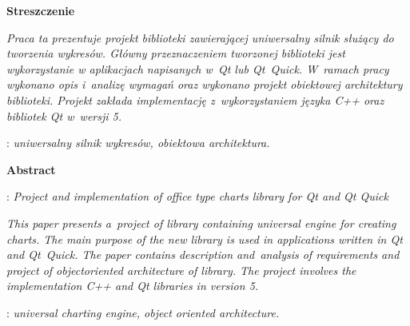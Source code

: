 \begin{titlepage}
    \newpage\thispagestyle{empty}
    \vspace*{2\baselineskip}
    \begin{center}
	{\large\bfseries Streszczenie}\par\bigskip
    \end{center}

    {\itshape
    Praca ta prezentuje projekt biblioteki zawierającej uniwersalny silnik służący do tworzenia wykresów. Główny przeznaczeniem tworzonej biblioteki jest wykorzystanie w aplikacjach napisanych w~Qt lub Qt~Quick.
	W~ramach pracy wykonano opis i~analizę wymagań oraz wykonano projekt obiektowej architektury biblioteki. Projekt zakłada implementację z~wykorzystaniem języka C++ oraz bibliotek Qt w~wersji 5.
	}
    \vspace*{1\baselineskip}

    : {\itshape uniwersalny silnik wykresów, obiektowa architektura.}
    \par
    \vspace{4\baselineskip}
    \begin{center}
	{\large\bfseries Abstract}\par\bigskip
    \end{center}
    : {\itshape Project and implementation of office type charts library for Qt and Qt Quick}\par
    \vspace*{1\baselineskip}
    {\itshape
    This paper presents a~project of library containing universal engine for creating charts. The main purpose of the new library is used in applications written in Qt and Qt~Quick.
The paper contains description and~analysis of requirements and project of object ​​oriented architecture of library. The project involves the implementation C++ and Qt libraries in version 5.}
    \vspace*{1\baselineskip}

    : {\itshape universal charting engine, object oriented architecture.}

\end{titlepage}

